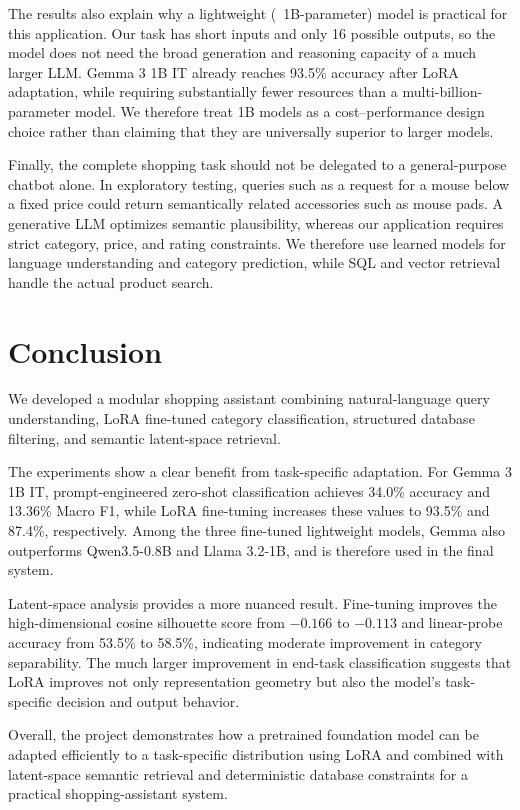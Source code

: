 \documentclass{article}
\begin{document}
The results also explain why a lightweight (~1B-parameter) model
is practical for this application. Our task has short inputs and only 16
possible outputs, so the model does not need the broad generation and
reasoning capacity of a much larger LLM. Gemma 3 1B IT already reaches
93.5\% accuracy after LoRA adaptation, while requiring substantially fewer
resources than a multi-billion-parameter model. We therefore treat 1B models
as a cost--performance design choice rather than claiming that they are
universally superior to larger models.

Finally, the complete shopping task should not be delegated to a
general-purpose chatbot alone. In exploratory testing, queries such as a
request for a mouse below a fixed price could return semantically related
accessories such as mouse pads. A generative LLM optimizes semantic
plausibility, whereas our application requires strict category, price, and
rating constraints. We therefore use learned models for language
understanding and category prediction, while SQL and vector retrieval handle
the actual product search.


\section{Conclusion}

We developed a modular shopping assistant combining natural-language query
understanding, LoRA fine-tuned category classification, structured database
filtering, and semantic latent-space retrieval.

The experiments show a clear benefit from task-specific adaptation. For
Gemma 3 1B IT, prompt-engineered zero-shot classification achieves 34.0\%
accuracy and 13.36\% Macro F1, while LoRA fine-tuning increases these values
to 93.5\% and 87.4\%, respectively. Among the three fine-tuned lightweight
models, Gemma also outperforms Qwen3.5-0.8B and Llama 3.2-1B, and is therefore
used in the final system.

Latent-space analysis provides a more nuanced result. Fine-tuning improves
the high-dimensional cosine silhouette score from $-0.166$ to $-0.113$ and
linear-probe accuracy from 53.5\% to 58.5\%, indicating moderate improvement
in category separability. The much larger improvement in end-task
classification suggests that LoRA improves not only representation geometry
but also the model's task-specific decision and output behavior.

Overall, the project demonstrates how a pretrained foundation model can be
adapted efficiently to a task-specific distribution using LoRA and combined
with latent-space semantic retrieval and deterministic database constraints
for a practical shopping-assistant system.
\end{document}
